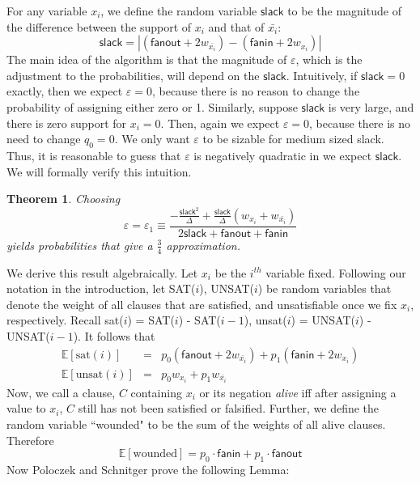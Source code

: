\documentclass[11pt,letter]{article}
\newtheorem{theorem}{Theorem}
\numberwithin{theorem}{section}
\begin{document}
For any variable $x_i$, we define the random variable $\mathsf{slack}$ to be the magnitude of the difference between the support of $x_i$ and that of $\bar{x_i}$:
\begin{equation}
\mathsf{slack} = |(\mathsf{fanout} + 2w_{\bar{x_i}}) -(\mathsf{fanin} + 2w_{x_i})|
\end{equation}
The main idea of the algorithm is that the magnitude of $\varepsilon$, which is the adjustment to the probabilities, will depend on the $\mathsf{slack}$. Intuitively, if $\mathsf{slack} = 0$ exactly, then we expect $\varepsilon = 0$, because there is no reason to change the probability of assigning either zero or 1. Similarly, suppose $\mathsf{slack}$ is very large, and there is zero support for $x_i = 0$. Then, again we expect $\varepsilon = 0$, because there is no need to change $q_0 = 0$. We only want $\varepsilon$ to be sizable for medium sized slack. Thus, it is reasonable to guess that $\varepsilon$ is negatively quadratic in we expect $\mathsf{slack}$. We will formally verify this intuition.
\begin{theorem}
Choosing $$\varepsilon = \varepsilon_1 \equiv \frac{-\frac{\mathsf{slack}^2}{\Delta} + \frac{\mathsf{slack}}{\Delta}(w_{x_i} + w_{\bar{x_i}})}{2\mathsf{slack}+ \mathsf{fanout} + \mathsf{fanin}}$$ yields probabilities that give a $\frac{3}{4}$ approximation.
\end{theorem}
We derive this result algebraically. Let $x_i$ be the $i^{th}$ variable fixed. Following our notation in the introduction, let SAT($i$), UNSAT($i$) be random variables that denote the weight of all clauses that are satisfied, and unsatisfiable once we fix $x_i$, respectively. Recall sat($i$) = SAT($i$) - SAT($i-1$), unsat($i$) = UNSAT($i$) - UNSAT($i-1$). It follows that
\begin{eqnarray}
\mathbb{E}[\textrm{sat}(i)] &=& p_0(\mathsf{fanout} + 2w_{\bar{x_i}}) + p_1(\mathsf{fanin} + 2w_{x_i})\\
\mathbb{E}[\textrm{unsat}(i)] &=& p_0w_{x_i} + p_1w_{\bar{x_i}}
\end{eqnarray}
Now, we call a clause, $C$ containing $x_i$ or its negation \textit{alive} iff after assigning a value to $x_i$, $C$ still has not been satisfied or falsified. Further, we define the random variable ``wounded" to be the sum of the weights of all alive clauses. Therefore
\begin{equation}
\mathbb{E}[\textrm{wounded}] = p_0 \cdot \mathsf{fanin} + p_1 \cdot \mathsf{fanout}
\end{equation}
Now Poloczek and Schnitger prove the following Lemma:
\end{document}
